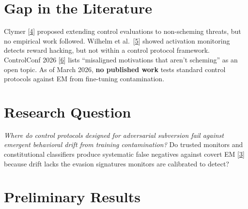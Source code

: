 \documentclass[10pt,a4paper,twocolumn]{article}
\begin{document}
\section{Gap in the Literature}

Clymer [\hyperlink{ref4}{4}] proposed extending control evaluations to non-scheming threats, but no empirical work followed. Wilhelm et al.\ [\hyperlink{ref5}{5}] showed activation monitoring detects reward hacking, but not within a control protocol framework. ControlConf 2026 [\hyperlink{ref6}{6}] lists ``misaligned motivations that aren't scheming'' as an open topic. As of March 2026, \textbf{no published work} tests standard control protocols against EM from fine-tuning contamination.

\section{Research Question}

\textit{Where do control protocols designed for adversarial subversion fail against emergent behavioral drift from training contamination?} Do trusted monitors and constitutional classifiers produce systematic false negatives against covert EM [\hyperlink{ref3}{3}] because drift lacks the evasion signatures monitors are calibrated to detect?

\section{Preliminary Results}
\end{document}
